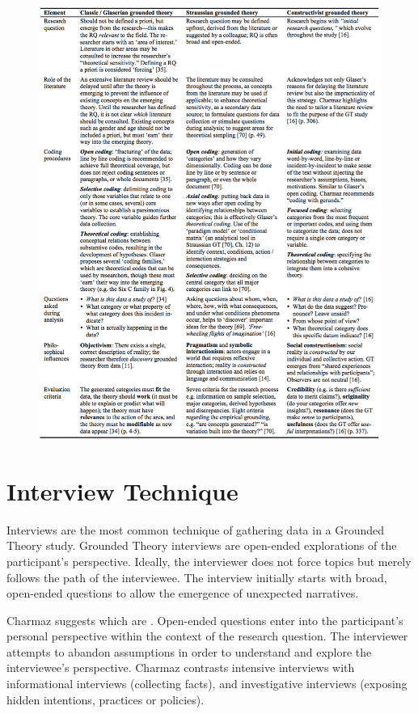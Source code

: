 \begin{figure}[h]
\centering
\label{GroundedTheoryComparison}
\includegraphics[width=6.4in]{grounded_theory_images/stohl_grounded_theory_comparison.png}
\end{figure}

\section{Interview Technique}
Interviews are the most common technique of gathering data in a Grounded Theory study. Grounded Theory interviews are open-ended explorations of the participant's perspective. Ideally, the interviewer does not force topics but merely follows the path of the interviewee. The interview initially starts with broad, open-ended questions to allow the emergence of unexpected narratives. 

Charmaz suggests  which are  \cite{Charmaz}. Open-ended questions enter into the participant's personal perspective within the context of the research question. The interviewer attempts to abandon assumptions in order to understand and explore the interviewee's perspective. Charmaz \cite{Charmaz} contrasts intensive interviews with informational interviews (collecting facts), and investigative interviews (exposing hidden intentions, practices or policies).

